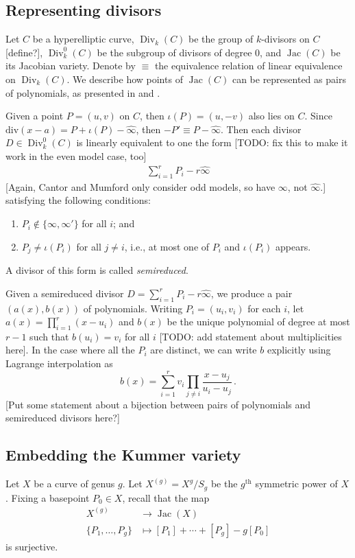 \documentclass[reqno, 12pt]{amsart}
\theoremstyle{definition}
\renewcommand{\div}{\text{div}}
\newcommand{\wh}{\widehat}
\DeclareMathOperator{\Jac}{Jac}
\DeclareMathOperator{\Div}{Div}
\newcommand{\whinfty}{\wh{\infty}}
\newcommand{\sss}[1]{{\color{blue} [#1]}}
\begin{document}
\subsection{Representing divisors}
Let $C$ be a hyperelliptic curve, $\Div_k(C)$ be the group of $k$-divisors on $C$ \sss{define?}, $\Div^0_k(C)$ be the subgroup of divisors of degree $0$, and $\Jac(C)$ be its Jacobian variety. Denote by $\equiv$ the equivalence relation of linear equivalence on $\Div_k(C)$. We describe how points of $\Jac(C)$ can be represented as pairs of polynomials, as presented in \cite{Cantor} and \cite[\S1]{Mumford}.

Given a point $P = (u,v)$ on $C$, then $\iota(P) = (u,-v)$ also lies on $C$. Since $\div(x - a) = P + \iota(P) - \wh{\infty}$, then $-P' \equiv P - \wh{\infty}$. Then each divisor $D \in \Div^0_k(C)$ is linearly equivalent to one the form \sss{TODO: fix this to make it work in the even model case, too}
\begin{align} \label{semireduced}
\sum_{i=1}^r P_i - r \whinfty
\end{align}
\sss{Again, Cantor and Mumford only consider odd models, so have $\infty$, not $\whinfty$.}
satisfying the following conditions:
\begin{enumerate}
\item
$P_i \notin \{\infty, \infty'\}$ for all $i$; and

\item
$P_j \neq \iota(P_i)$ for all $j \neq i$, i.e., at most one of $P_i$ and $\iota(P_i)$ appears.
\end{enumerate}
A divisor of this form is called \textit{semireduced}.

Given  a semireduced divisor $D = \sum_{i=1}^r P_i - r \whinfty$, we produce a pair $(a(x), b(x))$ of polynomials. Writing $P_i = (u_i, v_i)$ for each $i$, let $a(x) = \prod_{i = 1}^r (x - u_i)$ and $b(x)$ be the unique polynomial of degree at most $r-1$ such that $b(u_i) = v_i$ for all $i$ \sss{TODO: add statement about multiplicities here}. In the case where all the $P_i$ are distinct, we can write $b$ explicitly using Lagrange interpolation as
$$
b(x) = \sum_{i=1}^r  v_i \prod_{j \neq i} \frac{x - u_j}{u_i - u_j} \, .
$$
\sss{Put some statement about a bijection between pairs of polynomials and semireduced divisors here?}

\subsection{Embedding the Kummer variety}
Let $X$ be a curve of genus $g$. Let $X^{(g)} = X^g/S_g$ be the $g^\text{th}$ symmetric power of $X$. Fixing a basepoint $P_0 \in X$, recall that the map
\begin{align*}
X^{(g)} &\to \Jac(X)\\
\{P_1, \ldots, P_g\} &\mapsto [P_1] + \cdots + [P_g] - g[P_0]
\end{align*}
is surjective.
\end{document}
